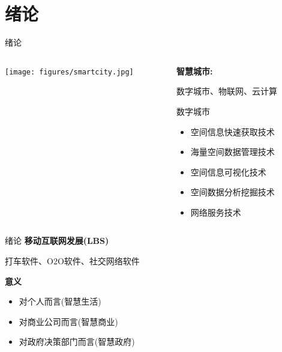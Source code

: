 \section{绪论}

\begin{frame}{绪论}
    \begin{columns}
        \begin{column}{0.5\textwidth}
        \texttt{[image: figures/smartcity.jpg]}
        \end{column}

        \begin{column}{0.5\textwidth}
        \textbf{智慧城市:} 
        
        数字城市、物联网、云计算
        \vspace{2em}

        \pause
        \alert{数字城市}
        \begin{itemize}[<+- | alert@+>]
        \item {空间信息快速获取技术}
        \item 海量空间数据管理技术
        \item 空间信息可视化技术
        \item 空间数据分析挖掘技术
        \item 网络服务技术
        \end{itemize}
        \end{column}
   \end{columns}
\end{frame}

\begin{frame}{绪论}
    \textbf{移动互联网发展(LBS)}

    打车软件、O2O软件、社交网络软件

    \vspace{2em}
    \pause
    \textbf{意义}
    \begin{itemize}
        \pause
        \item 对个人而言(智慧生活)
        \pause
        \item 对商业公司而言(智慧商业)
        \pause
        \item 对政府决策部门而言(智慧政府)
    \end{itemize}
\end{frame}

